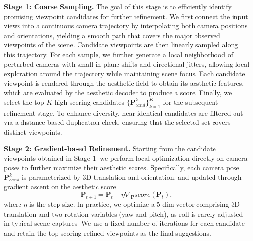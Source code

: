 \noindent\textbf{Stage 1: Coarse Sampling.}
The goal of this stage is to efficiently identify promising viewpoint candidates for further refinement.
We first connect the input views into a continuous camera trajectory by interpolating both camera positions and orientations, yielding a smooth path that covers the major observed viewpoints of the scene.
Candidate viewpoints are then linearly sampled along this trajectory.
For each sample, we further generate a local neighborhood of perturbed cameras with small in-plane shifts and directional jitters, allowing local exploration around the trajectory while maintaining scene focus.
Each candidate viewpoint is rendered through the aesthetic field to obtain its aesthetic features, which are evaluated by the aesthetic decoder to produce a score.
Finally, we select the top-$K$ high-scoring candidates $\{\mathbf{P}_{cand}^k\}_{k=1}^K$ for the subsequent refinement stage. To enhance diversity, near-identical candidates are filtered out via a distance-based duplication check, ensuring that the selected set covers distinct viewpoints.



\noindent\textbf{Stage 2: Gradient-based Refinement.} Starting from the candidate viewpoints obtained in Stage 1, we perform local optimization directly on camera poses to further maximize their aesthetic scores.
Specifically, each camera pose $\mathbf P_{cand}^k$ is parameterized by 3D translation and orientation, and updated through gradient ascent on the aesthetic score:
\begin{equation}
    \mathbf P_{t+1}=\mathbf P_{t} + \eta \nabla_{\mathbf P}score(\mathbf P_{t}),
\end{equation}
where $\eta$ is the step size.
In practice, we optimize a 5-dim vector comprising 3D translation and two rotation variables (yaw and pitch), as roll is rarely adjusted in typical scene captures. 
We use a fixed number of iterations for each candidate and retain the top-scoring refined viewpoints as the final suggestions.